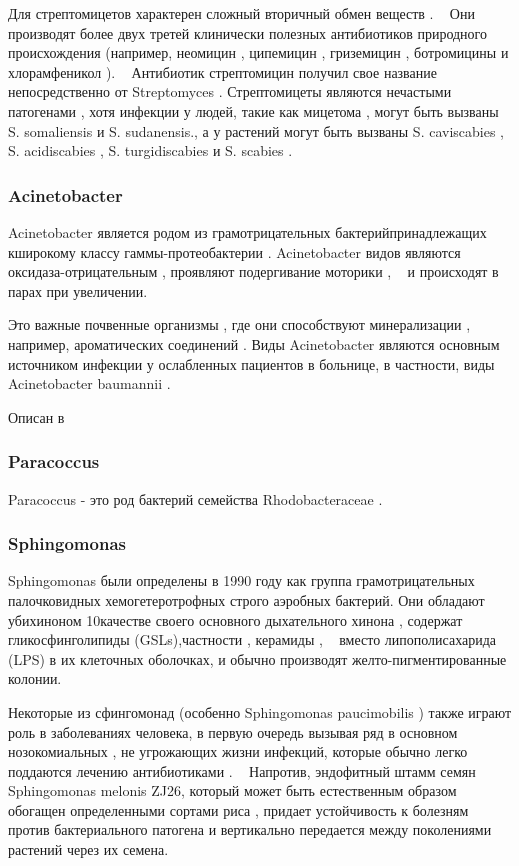 \documentclass[11pt]{article}
\begin{document}
	Для стрептомицетов характерен сложный вторичный обмен веществ .  ~\cite{Streptomyces_4} Они производят более двух третей клинически полезных антибиотиков природного происхождения (например, неомицин , ципемицин , гриземицин , ботромицины и хлорамфеникол ).  ~\cite{Streptomyces_5, Streptomyces_6} Антибиотик стрептомицин получил свое название непосредственно от Streptomyces . Стрептомицеты являются нечастыми патогенами , хотя инфекции у людей, такие как мицетома , могут быть вызваны S. somaliensis и S. sudanensis., а у растений могут быть вызваны S. caviscabies , S. acidiscabies , S. turgidiscabies и S. scabies .
	
	\subsubsection{Acinetobacter}
	Acinetobacter является родом из грамотрицательных бактерийпринадлежащих кширокому классу гаммы-протеобактерии . Acinetobacter видов являются оксидаза-отрицательным , проявляют подергивание моторики ,  ~\cite{Acinetobacter_7} и происходят в парах при увеличении.
	
	Это важные почвенные организмы , где они способствуют минерализации , например, ароматических соединений . Виды Acinetobacter являются основным источником инфекции у ослабленных пациентов в больнице, в частности, виды Acinetobacter baumannii .

	Описан в ~\cite{Acinetobacter_1}
	
	\subsubsection{Paracoccus}
	Paracoccus - это род бактерий семейства Rhodobacteraceae . ~\cite{Paracoccus_1}
	
	\subsubsection{Sphingomonas}
	Sphingomonas были определены в 1990 году как группа грамотрицательных палочковидных хемогетеротрофных строго аэробных бактерий. Они обладают убихиноном 10качестве своего основного дыхательного хинона , содержат гликосфинголипиды (GSLs),частности , керамиды , ~\cite{Sphingomonas_2} вместо липополисахарида (LPS) в их клеточных оболочках, и обычно производят желто-пигментированные колонии. ~\cite{Sphingomonas_3}
	
	Некоторые из сфингомонад (особенно Sphingomonas paucimobilis ) также играют роль в заболеваниях человека, в первую очередь вызывая ряд в основном нозокомиальных , не угрожающих жизни инфекций, которые обычно легко поддаются лечению антибиотиками . ~\cite{Sphingomonas_4, Sphingomonas_5} Напротив, эндофитный штамм семян Sphingomonas melonis ZJ26, который может быть естественным образом обогащен определенными сортами риса , придает устойчивость к болезням против бактериального патогена и вертикально передается между поколениями растений через их семена. ~\cite{Sphingomonas_6}
	
\end{document}
